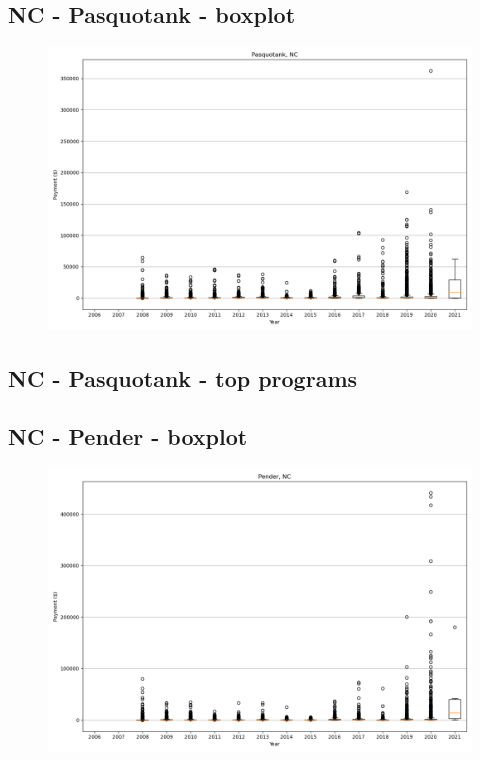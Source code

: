 \subsection*{NC - Pasquotank - boxplot}
\begin{figure}[h]
\centering
\includegraphics[width=7in]{../output/boxplots/counties/Pasquotank-NC_boxplot.png}
\end{figure}


\subsection*{NC - Pasquotank - top programs}

\newpage
\subsection*{NC - Pender - boxplot}
\begin{figure}[h]
\centering
\includegraphics[width=7in]{../output/boxplots/counties/Pender-NC_boxplot.png}
\end{figure}


